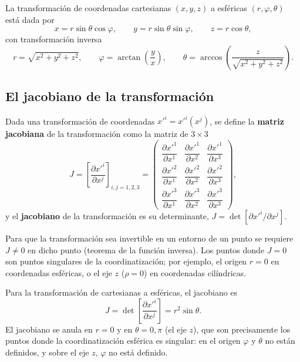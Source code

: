 \begin{ejemplo}
La transformación de coordenadas cartesianas $(x,y,z)$ a esféricas
$(r,\varphi,\theta)$ está dada por
\[
x = r\sin\theta\cos\varphi, \qquad y = r\sin\theta\sin\varphi, \qquad
z = r\cos\theta,
\]
con transformación inversa
\[
r = \sqrt{x^2+y^2+z^2}, \qquad
\varphi = \arctan\!\left(\frac{y}{x}\right), \qquad
\theta = \arccos\!\left(\frac{z}{\sqrt{x^2+y^2+z^2}}\right).
\]
\end{ejemplo}

\subsection{El jacobiano de la transformación}

\begin{definicion}
Dada una transformación de coordenadas $x'^i=x'^i(x^j)$, se define la
\textbf{matriz jacobiana} de la transformación como la matriz de
$3\times 3$
\[
J = \left[ \frac{\partial x'^i}{\partial x^j} \right]_{i,j=1,2,3} =
\begin{pmatrix}
\dfrac{\partial x'^1}{\partial x^1} & \dfrac{\partial x'^1}{\partial x^2} &
\dfrac{\partial x'^1}{\partial x^3} \\[8pt]
\dfrac{\partial x'^2}{\partial x^1} & \dfrac{\partial x'^2}{\partial x^2} &
\dfrac{\partial x'^2}{\partial x^3} \\[8pt]
\dfrac{\partial x'^3}{\partial x^1} & \dfrac{\partial x'^3}{\partial x^2} &
\dfrac{\partial x'^3}{\partial x^3}
\end{pmatrix},
\]
y el \textbf{jacobiano} de la transformación es su determinante,
$J = \det\!\left[\partial x'^i/\partial x^j\right]$.
\end{definicion}

\begin{observacion}
Para que la transformación sea invertible en un entorno de un punto se
requiere $J\neq 0$ en dicho punto (teorema de la función inversa). Los puntos donde $J=0$ son puntos singulares de la coordinatización; por
ejemplo, el origen $r=0$ en coordenadas esféricas, o el eje $z$
($\rho=0$) en coordenadas cilíndricas.
\end{observacion}

\begin{ejemplo}
Para la transformación de cartesianas a esféricas, el jacobiano es
\[
J = \det\!\left[\frac{\partial x'^i}{\partial x^j}\right] = r^2\sin\theta .
\]
El jacobiano se anula en $r=0$ y en $\theta=0,\pi$ (el eje $z$), que son
precisamente los puntos donde la coordinatización esférica es singular:
en el origen $\varphi$ y $\theta$ no están definidos, y sobre el eje $z$,
$\varphi$ no está definido.
\end{ejemplo}

